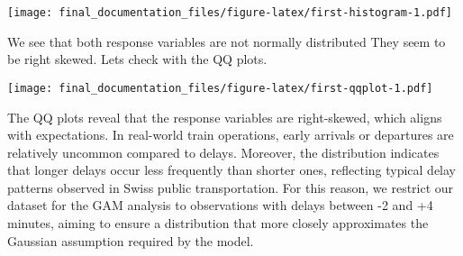 \documentclass[
]{article}
\newenvironment{Shaded}{\begin{snugshade}}{\end{snugshade}}
\newcommand{\AttributeTok}[1]{\textcolor[rgb]{0.13,0.29,0.53}{#1}}
\newcommand{\DecValTok}[1]{\textcolor[rgb]{0.00,0.00,0.81}{#1}}
\newcommand{\FunctionTok}[1]{\textcolor[rgb]{0.13,0.29,0.53}{\textbf{#1}}}
\newcommand{\NormalTok}[1]{#1}
\newcommand{\SpecialCharTok}[1]{\textcolor[rgb]{0.81,0.36,0.00}{\textbf{#1}}}
\newcommand{\StringTok}[1]{\textcolor[rgb]{0.31,0.60,0.02}{#1}}
\begin{document}
\texttt{[image: final\_documentation\_files/figure-latex/first-histogram-1.pdf]}

We see that both response variables are not normally distributed They
seem to be right skewed. Lets check with the QQ plots.

\begin{Shaded}
\end{Shaded}

\texttt{[image: final\_documentation\_files/figure-latex/first-qqplot-1.pdf]}

The QQ plots reveal that the response variables are right-skewed, which
aligns with expectations. In real-world train operations, early arrivals
or departures are relatively uncommon compared to delays. Moreover, the
distribution indicates that longer delays occur less frequently than
shorter ones, reflecting typical delay patterns observed in Swiss public
transportation. For this reason, we restrict our dataset for the GAM
analysis to observations with delays between -2 and +4 minutes, aiming
to ensure a distribution that more closely approximates the Gaussian
assumption required by the model.
\end{document}
